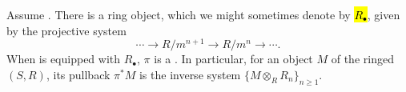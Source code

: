 \begin{definition}\label{definition:ringed_site_structure_on_category_of_inverse_sequences_of_a_site}
    Assume .
    There is a ring object, which we might sometimes denote by \hl{$R_\bullet$}, given by the projective system
    $$\cdots \to R/m^{n+1} \to R/m^n \to  \cdots.$$
    When  is equipped with $R_\bullet$, $\pi$ is a . In particular, for an object $M$ of the ringed  $(S, R)$, its pullback $\pi^* M$ is the inverse system $\{M \otimes_R R_n\}_{n \geq 1}$. 
\end{definition}